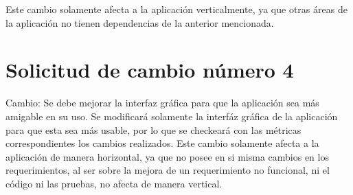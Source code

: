 Este cambio solamente afecta a la aplicación verticalmente, ya que otras áreas de la aplicación no tienen dependencias de la anterior mencionada.

\section{Solicitud de cambio número 4}

Cambio: Se debe mejorar la interfaz gráfica para que la aplicación sea más amigable en su
uso.
Se modificará solamente la interfáz gráfica de la aplicación para que esta sea más usable, por lo que se checkeará con las métricas correspondientes los cambios realizados. Este cambio solamente afecta a la aplicación de manera horizontal, ya que no posee en si misma cambios en los requerimientos, al ser sobre la mejora de un requerimiento no funcional, ni el código ni las pruebas, no afecta de manera vertical.


